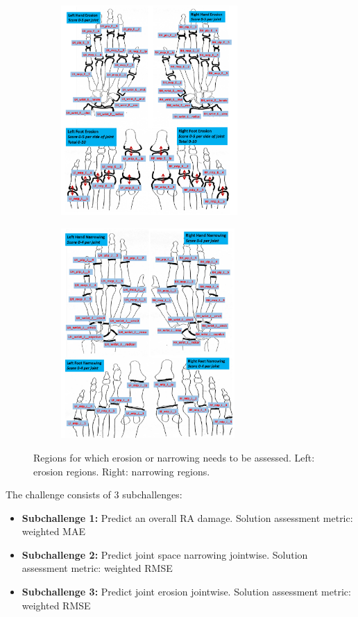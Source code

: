\documentclass[thesis=B,english]{FITthesis}[2019/12/23]
\begin{document}
\begin{figure}[h]
	
	\begin{subfigure}[b]{.48\textwidth}
		\centering
		\includegraphics[height = 8cm]{images/erosion_regions.png}
	\end{subfigure}
	\begin{subfigure}[b]{.48\textwidth}
		\centering
		\includegraphics[height = 8cm]{images/narrowing_regions.png}
	\end{subfigure}
	
	\caption{Regions for which erosion or narrowing needs to be assessed. Left: erosion regions. Right: narrowing regions.}
\end{figure}

The challenge consists of 3 subchallenges:
\begin{itemize}
	\item \textbf{Subchallenge 1:} Predict an overall RA damage. Solution assessment metric: weighted MAE
	\item \textbf{Subchallenge 2:} Predict joint space narrowing jointwise. Solution assessment metric: weighted RMSE
	\item \textbf{Subchallenge 3:} Predict joint erosion jointwise. Solution assessment metric: weighted RMSE
\end{itemize}
\end{document}
